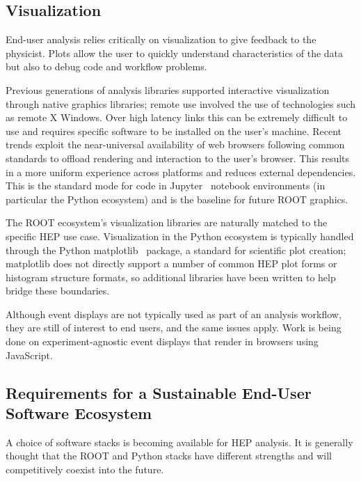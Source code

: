 \subsection{Visualization}

End-user analysis relies critically on visualization to give feedback to the physicist. Plots allow the user to quickly understand characteristics of the data but also to debug code and workflow problems.

Previous generations of analysis libraries supported interactive visualization through native graphics libraries; remote use involved the use of technologies such as remote X Windows. Over high latency links this can be extremely difficult to use and requires specific software to be installed on the user's machine. Recent trends exploit the near-universal availability of web browsers following common standards to offload rendering and interaction to the user's browser. This results in a more uniform experience across platforms and reduces external dependencies. This is the standard mode for code in Jupyter~\cite{soton403913} notebook environments (in particular the Python ecosystem) and is the baseline for future ROOT graphics.

The ROOT ecosystem's visualization libraries are naturally matched to the specific HEP use case. Visualization in the Python ecosystem is typically handled through the Python matplotlib~\cite{Hunter:2007} package, a standard for scientific plot creation; matplotlib does not directly support a number of common HEP plot forms or histogram structure formats, so additional libraries have been written to help bridge these boundaries.

Although event displays are not typically used as part of an analysis workflow, they are still of interest to end users, and the same issues apply. Work is being done on experiment-agnostic event displays that render in browsers using JavaScript.

\subsection{Requirements for a Sustainable End-User Software Ecosystem}
A choice of software stacks is becoming available for HEP analysis. It is generally thought that the ROOT and Python stacks have different strengths and will competitively coexist into the future.

